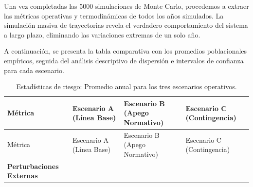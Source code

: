 \documentclass[
  spanish,
  us-letterpaper,
]{scrreprt}
\numberwithin{equation}{section}
\theoremstyle{plain}
\theoremstyle{plain}
\theoremstyle{plain}
\theoremstyle{definition}
\theoremstyle{remark}
\begin{document}
Una vez completadas las 5000 simulaciones de Monte Carlo, procedemos a
extraer las métricas operativas y termodinámicas de todos los años
simulados. La simulación masiva de trayectorias revela el verdadero
comportamiento del sistema a largo plazo, eliminando las variaciones
extremas de un solo año.

A continuación, se presenta la tabla comparativa con los promedios
poblacionales empíricos, seguida del análisis descriptivo de dispersión
e intervalos de confianza para cada escenario.

\begin{longtable}[]{@{}
  >{\raggedright\arraybackslash}p{}
  >{\centering\arraybackslash}p{}
  >{\centering\arraybackslash}p{}
  >{\centering\arraybackslash}p{}@{}}
\caption{Estadísticas de riesgo: Promedio anual para los tres escenarios
operativos.}\label{tbl-riesgo-operativo}\tabularnewline
\toprule\noalign{}
\begin{minipage}[b]{\linewidth}\raggedright
Métrica
\end{minipage} & \begin{minipage}[b]{\linewidth}\centering
Escenario A (Línea Base)
\end{minipage} & \begin{minipage}[b]{\linewidth}\centering
Escenario B (Apego Normativo)
\end{minipage} & \begin{minipage}[b]{\linewidth}\centering
Escenario C (Contingencia)
\end{minipage} \\
\midrule\noalign{}
\endfirsthead
\toprule\noalign{}
\begin{minipage}[b]{\linewidth}\raggedright
Métrica
\end{minipage} & \begin{minipage}[b]{\linewidth}\centering
Escenario A (Línea Base)
\end{minipage} & \begin{minipage}[b]{\linewidth}\centering
Escenario B (Apego Normativo)
\end{minipage} & \begin{minipage}[b]{\linewidth}\centering
Escenario C (Contingencia)
\end{minipage} \\
\midrule\noalign{}
\endhead
\bottomrule\noalign{}
\endlastfoot
\textbf{Perturbaciones Externas} & & & \\

\end{longtable}
\end{document}
